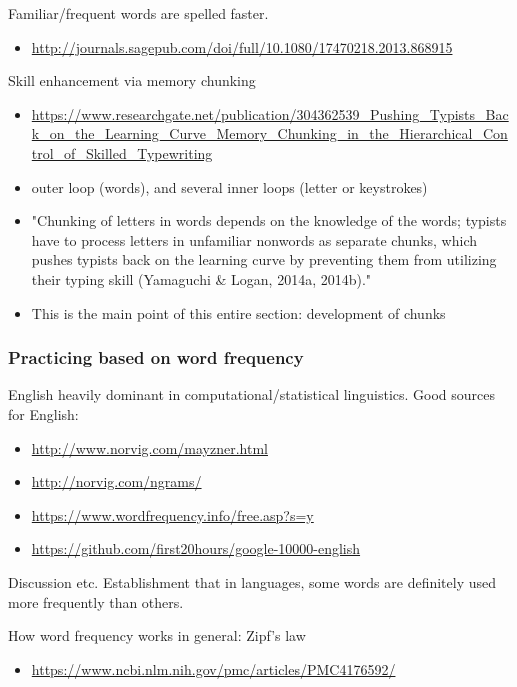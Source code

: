 \documentclass[11pt]{article}
\begin{document}
Familiar/frequent words are spelled faster.

\begin{itemize}
\item \url{http://journals.sagepub.com/doi/full/10.1080/17470218.2013.868915}
\end{itemize}

Skill enhancement via memory chunking

\begin{itemize}
\item \url{https://www.researchgate.net/publication/304362539\_Pushing\_Typists\_Back\_on\_the\_Learning\_Curve\_Memory\_Chunking\_in\_the\_Hierarchical\_Control\_of\_Skilled\_Typewriting}

\item outer loop (words), and several inner loops (letter or keystrokes)
\item "Chunking of letters in words depends on the knowledge of the words; typists have to process letters in unfamiliar nonwords as separate chunks, which pushes typists back on the learning curve by preventing them from utilizing their typing skill (Yamaguchi \& Logan, 2014a, 2014b)."
\item This is the main point of this entire section: development of chunks
\end{itemize}

\subsubsection{Practicing based on word frequency}
\label{sec:org9bd2fdd}

English heavily dominant in computational/statistical linguistics. Good sources for English:

\begin{itemize}
\item \url{http://www.norvig.com/mayzner.html}
\item \url{http://norvig.com/ngrams/}
\item \url{https://www.wordfrequency.info/free.asp?s=y}
\item \url{https://github.com/first20hours/google-10000-english}
\end{itemize}

Discussion etc. Establishment that in languages, some words are definitely used more frequently than others.

How word frequency works in general: Zipf's law

\begin{itemize}
\item \url{https://www.ncbi.nlm.nih.gov/pmc/articles/PMC4176592/}
\end{itemize}
\end{document}
